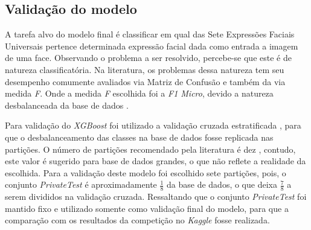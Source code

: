 \subsection{Validação do modelo}
A tarefa alvo do modelo final é classificar em qual das Sete Expressões Faciais Universais pertence determinada expressão facial dada como entrada a imagem de uma face. Observando o problema a ser resolvido, percebe-se que este é de natureza classificatória. Na literatura, os problemas dessa natureza tem seu desempenho comumente avaliados via Matriz de Confusão e também da via medida \emph{F}. Onde a medida \emph{F} escolhida foi a \emph{F1 Micro}, devido a natureza desbalanceada da base de dados \cite{}.

Para validação do \emph{XGBoost} foi utilizado a validação cruzada estratificada \cite{}, para que o desbalanceamento das classes na base de dados fosse replicada nas partições. O número de partições recomendado pela literatura é dez \cite{}, contudo, este valor é sugerido para base de dados grandes, o que não reflete a realidade da escolhida. Para a validação deste modelo foi escolhido sete partições, pois, o conjunto \emph{PrivateTest} é aproximadamente $\frac{1}{8}$ da base de dados, o que deixa $\frac{7}{8}$ a serem divididos na validação cruzada. Ressaltando que o conjunto \emph{PrivateTest} foi mantido fixo e utilizado somente como validação final do modelo, para que a comparação com os resultados da competição no \emph{Kaggle} fosse realizada.